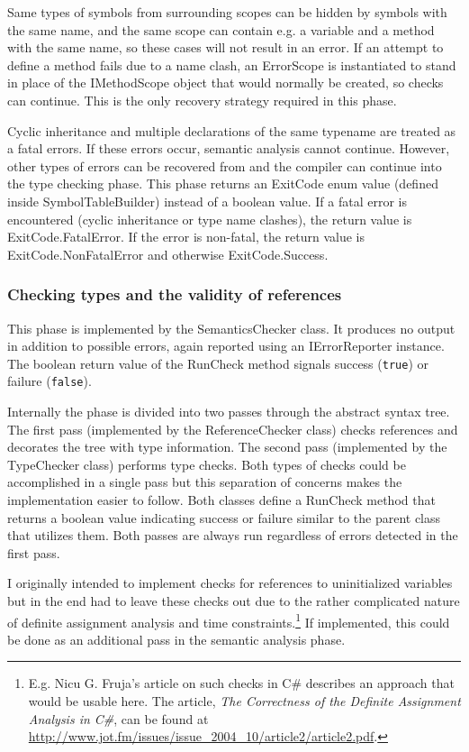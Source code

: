 \documentclass[a4paper,11pt]{article}
\begin{document}
Same types of symbols from surrounding scopes can be hidden by symbols with the same name, and the same scope can contain e.g. a variable and a method with the same name, so these cases will not result in an error. If an attempt to define a method fails due to a name clash, an ErrorScope is instantiated to stand in place of the IMethodScope object that would normally be created, so checks can continue. This is the only recovery strategy required in this phase.

Cyclic inheritance and multiple declarations of the same typename are treated as a fatal errors. If these errors occur, semantic analysis cannot continue. However, other types of errors can be recovered from and the compiler can continue into the type checking phase. This phase returns an ExitCode enum value (defined inside SymbolTableBuilder) instead of a boolean value. If a fatal error is encountered (cyclic inheritance or type name clashes), the return value is ExitCode.FatalError. If the error is non-fatal, the return value is ExitCode.NonFatalError and otherwise ExitCode.Success.

\subsubsection{Checking types and the validity of references}

This phase is implemented by the SemanticsChecker class. It produces no output in addition to possible errors, again reported using an IErrorReporter instance. The boolean return value of the RunCheck method signals success (\verb,true,) or failure (\verb,false,).

Internally the phase is divided into two passes through the abstract syntax tree. The first pass (implemented by the ReferenceChecker class) checks references and decorates the tree with type information. The second pass (implemented by the TypeChecker class) performs type checks. Both types of checks could be accomplished in a single pass but this separation of concerns makes the implementation easier to follow. Both classes define a RunCheck method that returns a boolean value indicating success or failure similar to the parent class that utilizes them. Both passes are always run regardless of errors detected in the first pass.

I originally intended to implement checks for references to uninitialized variables but in the end had to leave these checks out due to the rather complicated nature of definite assignment analysis and time constraints.\footnote{E.g. Nicu G. Fruja's article on such checks in C\# describes an approach that would be usable here. The article, \emph{The Correctness of the Definite Assignment Analysis in C\#}, can be found at \url{http://www.jot.fm/issues/issue_2004_10/article2/article2.pdf}.} If implemented, this could be done as an additional pass in the semantic analysis phase.
\end{document}

